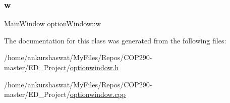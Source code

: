 \subsubsection{\texorpdfstring{w}{w}}
{\footnotesize\ttfamily \hyperlink{classMainWindow}{Main\+Window} option\+Window\+::w}



The documentation for this class was generated from the following files\+:\begin{DoxyCompactItemize}
\item 
/home/ankurshaswat/\+My\+Files/\+Repos/\+C\+O\+P290-\/master/\+E\+D\+\_\+\+Project/\hyperlink{optionwindow_8h}{optionwindow.\+h}\item 
/home/ankurshaswat/\+My\+Files/\+Repos/\+C\+O\+P290-\/master/\+E\+D\+\_\+\+Project/\hyperlink{optionwindow_8cpp}{optionwindow.\+cpp}\end{DoxyCompactItemize}

